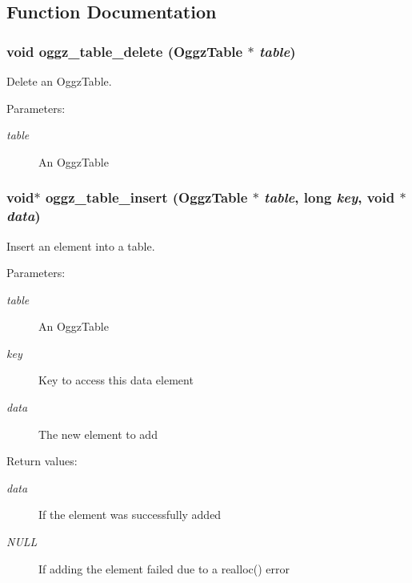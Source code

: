 \subsection{Function Documentation}
\subsubsection{\setlength{\rightskip}{0pt plus 5cm}void oggz\_\-table\_\-delete ({\bf Oggz\-Table} $\ast$ {\em table})}\label{oggz__table_8h_a2}


Delete an Oggz\-Table. 

\begin{Desc}
\item[Parameters:]
\begin{description}
\item[{\em table}]An Oggz\-Table \end{description}
\end{Desc}
\subsubsection{\setlength{\rightskip}{0pt plus 5cm}void$\ast$ oggz\_\-table\_\-insert ({\bf Oggz\-Table} $\ast$ {\em table}, long {\em key}, void $\ast$ {\em data})}\label{oggz__table_8h_a3}


Insert an element into a table. 

\begin{Desc}
\item[Parameters:]
\begin{description}
\item[{\em table}]An Oggz\-Table \item[{\em key}]Key to access this data element \item[{\em data}]The new element to add \end{description}
\end{Desc}
\begin{Desc}
\item[Return values:]
\begin{description}
\item[{\em data}]If the element was successfully added \item[{\em NULL}]If adding the element failed due to a realloc() error \end{description}
\end{Desc}
